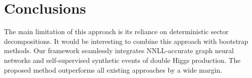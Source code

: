 \section{Conclusions}\label{sec:conclusions}

The main limitation of this approach is its reliance on deterministic
sector decompositions. It would be interesting to combine this approach
with bootstrap methods. Our framework seamlessly integrates
NNLL-accurate graph neural networks and self-supervised synthetic events
of double Higgs production. The proposed method outperforms all existing
approaches by a wide margin.

